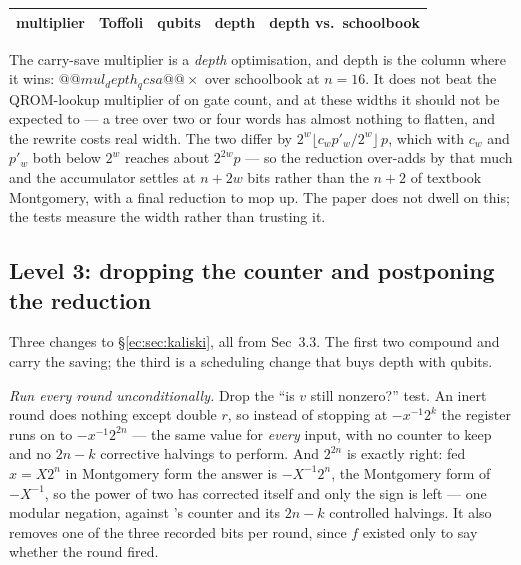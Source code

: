 
\begin{center}\small
\begin{tabular}{@{}lrrrr@{}}
\toprule
multiplier & Toffoli & qubits & depth & depth vs.\ schoolbook\\
\midrule
\bottomrule
\end{tabular}
\end{center}

\begin{warnbox}[title={What this table does \emph{not} show, and why}]
The carry-save multiplier is a \emph{depth} optimisation, and depth is the column where it wins:
$@@mul_depth_qcsa@@\times$ over schoolbook at $n=16$. It does not beat the QROM-lookup multiplier
of \cite{ec:hjnrs20} on gate count, and at these widths it should not be expected to --- a tree
over two or four words has almost nothing to flatten, and the rewrite costs real width. The two differ by
$2^w\lfloor c_wp'_w/2^w\rfloor\,p$, which with $c_w$ and $p'_w$ both below $2^w$ reaches about
$2^{2w}p$ --- so the reduction over-adds by that much and the accumulator settles at $n+2w$ bits
rather than the $n+2$ of textbook Montgomery, with a final reduction to mop up. The paper does not dwell
on this; the tests measure the width rather than trusting it.
\end{warnbox}

\subsection{Level 3: dropping the counter and postponing the reduction}\label{ec:sec:kalopt}

Three changes to \S\ref{ec:sec:kaliski}, all from \cite{ec:kim26} Sec~3.3. The first two compound
and carry the saving; the third is a scheduling change that buys depth with qubits.

\emph{Run every round unconditionally.} Drop the ``is $v$ still nonzero?'' test. An inert round does
nothing except double $r$, so instead of stopping at $-x^{-1}2^{k}$ the register runs on to
$-x^{-1}2^{2n}$ --- the same value for \emph{every} input, with no counter to keep and no $2n-k$
corrective halvings to perform. And $2^{2n}$ is exactly right: fed $x=X2^{n}$ in Montgomery form the
answer is $-X^{-1}2^{n}$, the Montgomery form of $-X^{-1}$, so the power of two has corrected itself
and only the sign is left --- one modular negation, against \cite{ec:hjnrs20}'s counter and its
$2n-k$ controlled halvings. It also removes one of the three recorded bits per round, since $f$ existed only to
say whether the round fired.

